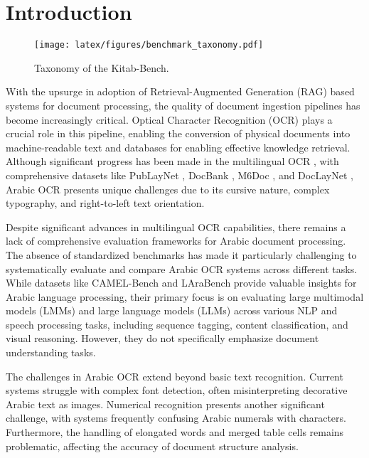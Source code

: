 \section{Introduction}
\begin{figure}[htbp]
    \centering
    \texttt{[image: latex/figures/benchmark\_taxonomy.pdf]}
    \caption{Taxonomy of the Kitab-Bench.}
    \label{fig:task_taxonomy}
\end{figure}

With the upsurge in adoption of Retrieval-Augmented Generation (RAG) based systems for document processing, the quality of document ingestion pipelines has become increasingly critical. Optical Character Recognition (OCR) plays a crucial role in this pipeline, enabling the conversion of physical documents into machine-readable text and databases for enabling effective knowledge retrieval. Although significant progress has been made in the multilingual OCR \cite{easyocr, fu2024ocrbench, wei2024general, smith2007overviewtesseract}, with comprehensive datasets like PubLayNet \cite{zhong2019publaynet}, DocBank \cite{li2020docbank}, M6Doc \cite{cheng2023m6doc}, and DocLayNet \cite{doclaynet2022}, Arabic OCR presents unique challenges due to its cursive nature, complex typography, and right-to-left text orientation. 

Despite significant advances in multilingual OCR capabilities, there remains a lack of comprehensive evaluation frameworks for Arabic document processing. The absence of standardized benchmarks has made it particularly challenging to systematically evaluate and compare Arabic OCR systems across different tasks. While datasets like CAMEL-Bench \cite{ghaboura2024camel} and LAraBench \cite{abdelali2023larabench} provide valuable insights for Arabic language processing, their primary focus is on evaluating large multimodal models (LMMs) and large language models (LLMs) across various NLP and speech processing tasks, including sequence tagging, content classification, and visual reasoning. However, they do not specifically emphasize document understanding tasks.

The challenges in Arabic OCR extend beyond basic text recognition. Current systems struggle with complex font detection, often misinterpreting decorative Arabic text as images. Numerical recognition presents another significant challenge, with systems frequently confusing Arabic numerals with characters. Furthermore, the handling of elongated words and merged table cells remains problematic, affecting the accuracy of document structure analysis.

